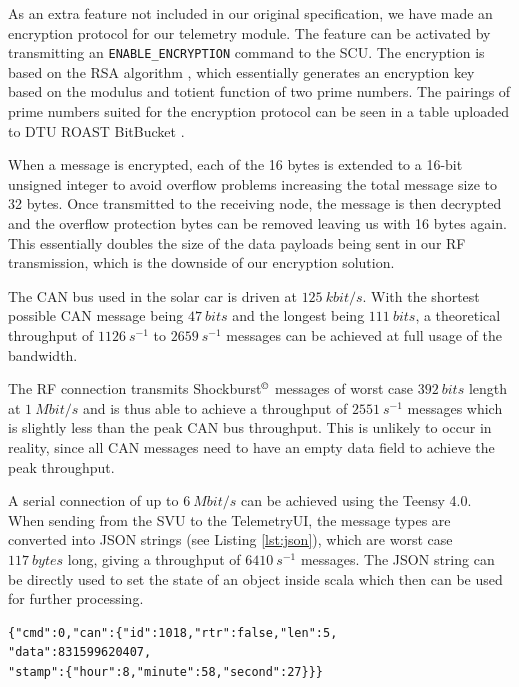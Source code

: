 \documentclass[a4paper,conference]{IEEEtran}
\begin{document}
As an extra feature not included in our original specification, we have made an encryption protocol for our telemetry module. The feature can be activated by transmitting an \texttt{ENABLE\_ENCRYPTION} command to the SCU. The encryption is based on the RSA algorithm \cite{rsa}, which essentially generates an encryption key based on the modulus and totient function of two prime numbers. The pairings of prime numbers suited for the encryption protocol can be seen in a table uploaded to DTU ROAST BitBucket \cite{prime}. 

When a message is encrypted, each of the 16 bytes is extended to a 16-bit unsigned integer to avoid overflow problems increasing the total message size to 32 bytes. Once transmitted to the receiving node, the message is then decrypted and the overflow protection bytes can be removed leaving us with 16 bytes again. This essentially doubles the size of the data payloads being sent in our RF transmission, which is the downside of our encryption solution.

The CAN bus used in the solar car is driven at $\SI{125}{kbit/s}$. With the shortest possible CAN message being $\SI{47}{bits}$ and the longest being $\SI{111}{bits}$, a theoretical throughput of $\SI{1126}{s^{-1}}$ to $\SI{2659}{s^{-1}}$ messages can be achieved at full usage of the bandwidth.%

The RF connection transmits Shockburst$^\copyright$ messages of worst case $\SI{392}{bits}$ length at $\SI{1}{Mbit/s}$ and is thus able to achieve a throughput of $\SI{2551}{s^{-1}}$ messages which is slightly less than the peak CAN bus throughput. This is unlikely to occur in reality, since all CAN messages need to have an empty data field to achieve the peak throughput.

A serial connection of up to $\SI{6}{Mbit/s}$ can be achieved using the Teensy 4.0. When sending from the SVU to the TelemetryUI, the message types are converted into JSON strings (see Listing \ref{lst:json}), which are worst case $\SI{117}{bytes}$ long, giving a throughput of $\SI{6410}{s^{-1}}$ messages. The JSON string can be directly used to set the state of an object inside scala which then can be used for further processing.

\begin{lstlisting}[caption={Example of a JSON string.},captionpos=b,label={lst:json}]
{"cmd":0,"can":{"id":1018,"rtr":false,"len":5,
"data":831599620407,
"stamp":{"hour":8,"minute":58,"second":27}}}
\end{lstlisting}
\end{document}
